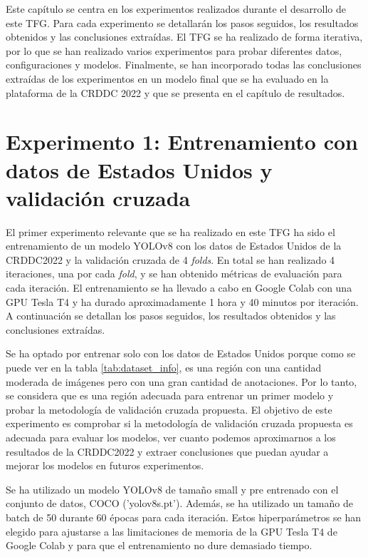 
Este capítulo se centra en los experimentos realizados durante el desarrollo de este TFG. Para cada experimento se detallarán los pasos seguidos, los resultados obtenidos y las conclusiones extraídas. El TFG se ha realizado de forma iterativa, por lo que se han realizado varios experimentos para probar diferentes datos, configuraciones y modelos. Finalmente, se han incorporado todas las conclusiones extraídas de los experimentos en un modelo final que se ha evaluado en la plataforma de la CRDDC 2022 y que se presenta en el capítulo de resultados.


\section{Experimento 1: Entrenamiento con datos de Estados Unidos y validación cruzada}\label{SEC:EXP1}

El primer experimento relevante que se ha realizado en este TFG ha sido el entrenamiento de un modelo YOLOv8 con los datos de Estados Unidos de la CRDDC2022 y la validación cruzada de 4 \textit{folds}. En total se han realizado 4 iteraciones, una por cada \textit{fold}, y se han obtenido métricas de evaluación para cada iteración. El entrenamiento se ha llevado a cabo en Google Colab con una GPU Tesla T4 y ha durado aproximadamente 1 hora y 40 minutos por iteración. A continuación se detallan los pasos seguidos, los resultados obtenidos y las conclusiones extraídas.

Se ha optado por entrenar solo con los datos de Estados Unidos porque como se puede ver en la tabla \ref{tab:dataset_info}, es una región con una cantidad moderada de imágenes pero con una gran cantidad de anotaciones. Por lo tanto, se considera que es una región adecuada para entrenar un primer modelo y probar la metodología de validación cruzada propuesta. El objetivo de este experimento es comprobar si la metodología de validación cruzada propuesta es adecuada para evaluar los modelos, ver cuanto podemos aproximarnos a los resultados de la CRDDC2022 y extraer conclusiones que puedan ayudar a mejorar los modelos en futuros experimentos.

Se ha utilizado un modelo YOLOv8 de tamaño small y pre entrenado con el conjunto de datos, COCO ('yolov8s.pt'). Además, se ha utilizado un tamaño de batch de 50 durante 60 épocas para cada iteración. Estos hiperparámetros se han elegido para ajustarse a las limitaciones de memoria de la GPU Tesla T4 de Google Colab y para que el entrenamiento no dure demasiado tiempo.

